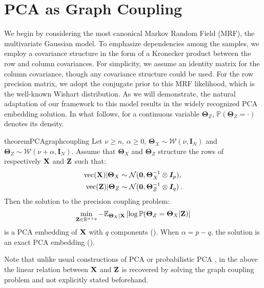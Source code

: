 \section{PCA as Graph Coupling}\label{sec:pca_graph_coupling}


We begin by considering the most canonical Markov Random Field (MRF), the multivariate Gaussian model. To emphasize dependencies among the samples, we employ a covariance structure in the form of a Kronecker product between the row and column covariances. For simplicity, we assume an identity matrix for the column covariance, though any covariance structure could be used. For the row precision matrix, we adopt the conjugate prior to this MRF likelihood, which is the well-known Wishart distribution. As we will demonstrate, the natural adaptation of our framework to this model results in the widely recognized PCA embedding solution. In what follows, for a continuous variable $\bm{\Theta}_{Z}$, $\mathbb{P}(\bm{\Theta}_{Z} = \cdot)$ denotes its density.

\begin{restatable}{theorem}{PCAgraphcoupling}
\label{PCA_graph_coupling}
Let $\nu \geq n$, $\alpha \geq 0$, $\bm{\Theta}_{X} \sim \mathcal{W}(\nu, \bm{I}_N)$ and $\bm{\Theta}_{Z} \sim \mathcal{W}(\nu + \alpha, \bm{I}_N)$. Assume that $\bm{\Theta}_{X}$ and $\bm{\Theta}_{Z}$ structure the rows of respectively $\mathbf{X}$ and $\mathbf{Z}$ such that: 
\begin{align}
    \mathrm{vec}(\mathbf{X}) | \bm{\Theta}_{X} &\sim \mathcal{N}(\bm{0}, \bm{\Theta}_{X}^{-1} \otimes \bm{I}_p), \label{eq:X_given_theta} \\
    \mathrm{vec}(\mathbf{Z}) | \bm{\Theta}_{Z} &\sim \mathcal{N}(\bm{0}, \bm{\Theta}_{Z}^{-1} \otimes \bm{I}_q) \label{eq:Z_given_theta} \:.
\end{align}
Then the solution to the precision coupling problem:
\begin{align*}
    \min_{\mathbf{Z} \in \mathbb{R}^{n \times q}} -\mathbb{E}_{\bm{\Theta}_{X} | \mathbf{X}}\left[\log \mathbb{P}(\bm{\Theta}_{Z}=\bm{\Theta}_{X}|\mathbf{Z})\right]
\end{align*}
is a PCA embedding of $\mathbf{X}$ with $q$ components (). When $\alpha = p - q$, the solution is an exact PCA embedding ().
\end{restatable}

Note that unlike usual constructions of PCA or probabilistic PCA \citep{tipping1999probabilistic}, in the above the linear relation between $\mathbf{X}$ and $\mathbf{Z}$ is recovered by solving the graph coupling problem and not explicitly stated beforehand. 

